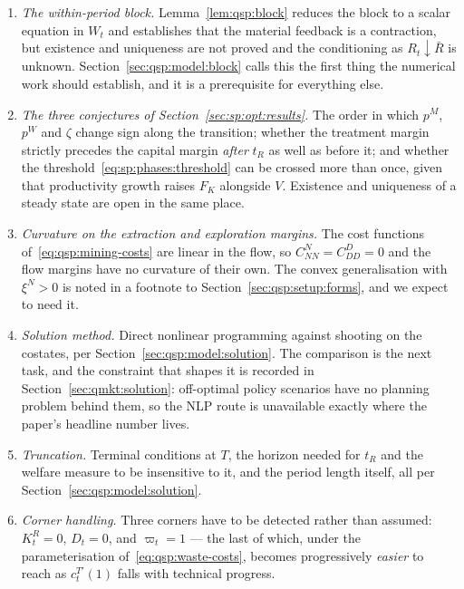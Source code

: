 \begin{enumerate}[leftmargin=2.2em,itemsep=0.25em]
\item \emph{The within-period block.} Lemma~\ref{lem:qsp:block} reduces the block to a scalar equation
in $W_t$ and establishes that the material feedback is a contraction, but existence and uniqueness are
not proved and the conditioning as $R_t\downarrow\bar R$ is unknown. Section~\ref{sec:qsp:model:block}
calls this the first thing the numerical work should establish, and it is a prerequisite for
everything else.

\item \emph{The three conjectures of Section~\ref{sec:sp:opt:results}.} The order in which $p^M$,
$p^W$ and $\zeta$ change sign along the transition; whether the treatment margin strictly precedes the
capital margin \emph{after} $t_R$ as well as before it; and whether the
threshold~\eqref{eq:sp:phases:threshold} can be crossed more than once, given that productivity growth
raises $F_K$ alongside $V$. Existence and uniqueness of a steady state are open in the same place.

\item \emph{Curvature on the extraction and exploration margins.} The cost functions
of~\eqref{eq:qsp:mining-costs} are linear in the flow, so $C^N_{NN}=C^D_{DD}=0$ and the flow margins
have no curvature of their own. The convex generalisation with $\xi^N>0$ is noted in a footnote to
Section~\ref{sec:qsp:setup:forms}, and we expect to need it.

\item \emph{Solution method.} Direct nonlinear programming against shooting on the costates,
per Section~\ref{sec:qsp:model:solution}. The comparison is the next task, and the constraint that
shapes it is recorded in Section~\ref{sec:qmkt:solution}: off-optimal policy scenarios have no
planning problem behind them, so the NLP route is unavailable exactly where the paper's headline
number lives.

\item \emph{Truncation.} Terminal conditions at $T$, the horizon needed for $t_R$ and the welfare
measure to be insensitive to it, and the period length itself, all per
Section~\ref{sec:qsp:model:solution}.

\item \emph{Corner handling.} Three corners have to be detected rather than assumed: $K^R_t=0$,
$D_t=0$, and $\varpi_t=1$ --- the last of which, under the parameterisation
of~\eqref{eq:qsp:waste-costs}, becomes progressively \emph{easier} to reach as $c^{T\prime}_t(1)$ falls
with technical progress.


\end{enumerate}
